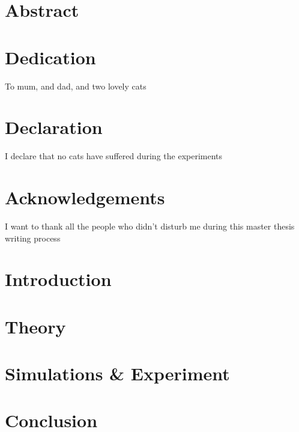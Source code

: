 \documentclass[a4paper,11pt]{article}
\begin{document}
\newpage

\section*{Abstract}

% 

\newpage

\section*{Dedication}
To mum, and dad, and two lovely cats

\section*{Declaration}
I declare that no cats have suffered during the experiments

\section*{Acknowledgements}
I want to thank all the people who didn't disturb me during this master thesis writing process

\newpage

\tableofcontents


\section{Introduction}


\section{Theory}


\section{Simulations \& Experiment}


\section{ }


\section{Conclusion}


\nocite{*}
\printbibliography

\begin{appendix}

\end{appendix}
\end{document}
